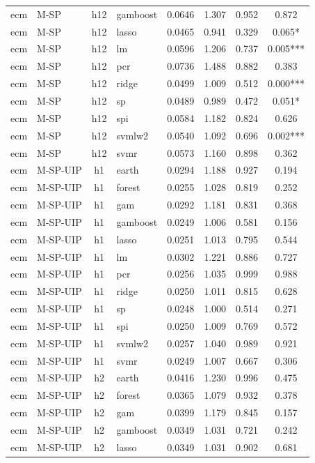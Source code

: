 \begin{ThreePartTable}
\begin{longtable}[t]{llclcccc}
ecm & M-SP & h12 & gamboost & 0.0646 & 1.307 & 0.952 & 0.872\\
ecm & M-SP & h12 & lasso & 0.0465 & 0.941 & 0.329 & 0.065*\\
ecm & M-SP & h12 & lm & 0.0596 & 1.206 & 0.737 & 0.005***\\
ecm & M-SP & h12 & pcr & 0.0736 & 1.488 & 0.882 & 0.383\\
ecm & M-SP & h12 & ridge & 0.0499 & 1.009 & 0.512 & 0.000***\\
ecm & M-SP & h12 & sp & 0.0489 & 0.989 & 0.472 & 0.051*\\
ecm & M-SP & h12 & spi & 0.0584 & 1.182 & 0.824 & 0.626\\
ecm & M-SP & h12 & svmlw2 & 0.0540 & 1.092 & 0.696 & 0.002***\\
ecm & M-SP & h12 & svmr & 0.0573 & 1.160 & 0.898 & 0.362\\
\addlinespace
ecm & M-SP-UIP & h1 & earth & 0.0294 & 1.188 & 0.927 & 0.194\\
ecm & M-SP-UIP & h1 & forest & 0.0255 & 1.028 & 0.819 & 0.252\\
ecm & M-SP-UIP & h1 & gam & 0.0292 & 1.181 & 0.831 & 0.368\\
ecm & M-SP-UIP & h1 & gamboost & 0.0249 & 1.006 & 0.581 & 0.156\\
ecm & M-SP-UIP & h1 & lasso & 0.0251 & 1.013 & 0.795 & 0.544\\
ecm & M-SP-UIP & h1 & lm & 0.0302 & 1.221 & 0.886 & 0.727\\
ecm & M-SP-UIP & h1 & pcr & 0.0256 & 1.035 & 0.999 & 0.988\\
ecm & M-SP-UIP & h1 & ridge & 0.0250 & 1.011 & 0.815 & 0.628\\
ecm & M-SP-UIP & h1 & sp & 0.0248 & 1.000 & 0.514 & 0.271\\
ecm & M-SP-UIP & h1 & spi & 0.0250 & 1.009 & 0.769 & 0.572\\
ecm & M-SP-UIP & h1 & svmlw2 & 0.0257 & 1.040 & 0.989 & 0.921\\
ecm & M-SP-UIP & h1 & svmr & 0.0249 & 1.007 & 0.667 & 0.306\\
\addlinespace
ecm & M-SP-UIP & h2 & earth & 0.0416 & 1.230 & 0.996 & 0.475\\
ecm & M-SP-UIP & h2 & forest & 0.0365 & 1.079 & 0.932 & 0.378\\
ecm & M-SP-UIP & h2 & gam & 0.0399 & 1.179 & 0.845 & 0.157\\
ecm & M-SP-UIP & h2 & gamboost & 0.0349 & 1.031 & 0.721 & 0.242\\
ecm & M-SP-UIP & h2 & lasso & 0.0349 & 1.031 & 0.902 & 0.681\\

\end{longtable}
\end{ThreePartTable}
